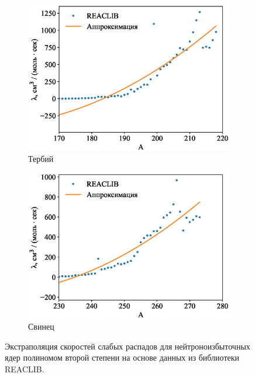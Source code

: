 \begin{figure}
  \centering
  \begin{subfigure}{0.48\textwidth}
    \centering
    \includegraphics[width=\textwidth]{pics/decay_fit65.eps}
    \caption{Тербий}
  \end{subfigure}
  \hfill
  \begin{subfigure}{0.48\textwidth}
    \centering
    \includegraphics[width=\textwidth]{pics/decay_fit82.eps}
    \caption{Свинец}
  \end{subfigure}
  \caption{Экстраполяция скоростей слабых распадов для нейтроноизбыточных ядер полиномом второй степени на основе данных из библиотеки REACLIB.}
  \label{img:weak_decay_fit}
\end{figure}

